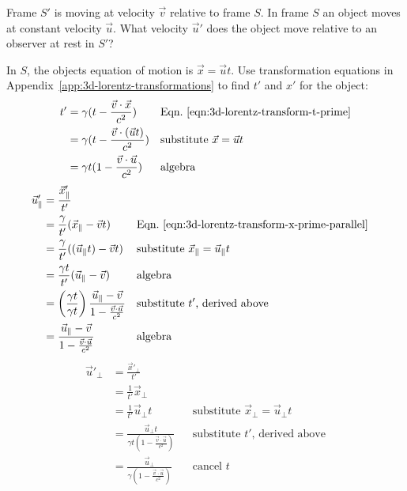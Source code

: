 \documentclass[a4paper]{article}
\theoremstyle{plain}
\theoremstyle{definition}
\newcommand{\vect}[1]{\vec{#1}}
\begin{document}
Frame $S'$ is moving at velocity $\vect{v}$ relative to frame $S$.
In frame $S$ an object moves at constant velocity $\vect{u}$.
What velocity $\vect{u}'$ does the object move relative to
an observer at rest in $S'$?

In $S$, the objects equation of motion is $\vect{x} = \vect{u} t$.
Use transformation equations
in Appendix~\ref{app:3d-lorentz-transformations}
to find $t'$ and $x'$ for the object:
\begin{align*}
t'
  & = \gamma (t - \frac{\vect{v} \cdot \vect{x}}{c^2}) & & \text{Eqn.~\eqref{eqn:3d-lorentz-transform-t-prime}} \\
  & = \gamma (t - \frac{\vect{v} \cdot (\vect{u} t)}{c^2}) & & \text{substitute $\vect{x} = \vect{u} t$} \\
  & = \gamma t (1 - \frac{\vect{v} \cdot \vect{u}}{c^2}) & & \text{algebra}
\end{align*}
\begin{align*}
\vect{u}'_{\parallel}
  & = \frac{\vect{x}'_{\parallel}}{t'} \\
  & = \frac{\gamma}{t'} (\vect{x}_{\parallel} - \vect{v}t) & & \text{Eqn.~\eqref{eqn:3d-lorentz-transform-x-prime-parallel}} \\
  & = \frac{\gamma}{t'} ((\vect{u}_{\parallel} t) - \vect{v}t) & & \text{substitute $\vect{x}_{\parallel} = \vect{u}_{\parallel} t$} \\
  & = \frac{\gamma t}{t'} (\vect{u}_{\parallel} - \vect{v}) & & \text{algebra} \\
  & = \left( \frac{\gamma t}{\gamma t} \right) \frac{\vect{u}_{\parallel} - \vect{v}}{1 - \frac{\vect{v} \cdot \vect{u}}{c^2}} & & \text{substitute $t'$, derived above} \\
  & = \frac{\vect{u}_{\parallel} - \vect{v}}{1 - \frac{\vect{v} \cdot \vect{u}}{c^2}} & & \text{algebra}
\end{align*}
\begin{align*}
\vect{u}'_{\perp}
  & = \frac{\vect{x}'_{\perp}}{t'} \\
  & = \frac{1}{t'} \vect{x}_{\perp} \\
  & = \frac{1}{t'} \vect{u}_{\perp} t & & \text{substitute $\vect{x}_{\perp} = \vect{u}_{\perp} t$} \\
  & = \frac{\vect{u}_{\perp} t}{\gamma t (1 - \frac{\vect{v} \cdot \vect{u}}{c^2})} & & \text{substitute $t'$, derived above} \\
  & = \frac{\vect{u}_{\perp}}{\gamma (1 - \frac{\vect{v} \cdot \vect{u}}{c^2})} & & \text{cancel $t$}
\end{align*}
\end{document}
